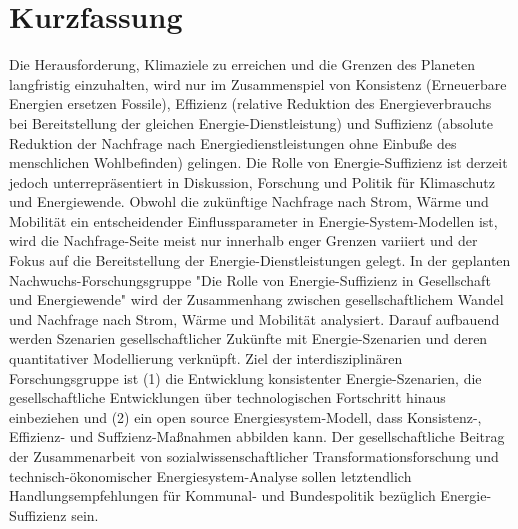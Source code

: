 \section*{Kurzfassung}
Die Herausforderung, Klimaziele zu erreichen und die Grenzen des Planeten langfristig einzuhalten, wird nur im Zusammenspiel von Konsistenz (Erneuerbare Energien ersetzen Fossile), Effizienz (relative Reduktion des Energieverbrauchs bei Bereitstellung der gleichen Energie-Dienstleistung) und Suffizienz (absolute Reduktion der Nachfrage nach Energiedienstleistungen ohne Einbuße des menschlichen Wohlbefinden) gelingen. Die Rolle von Energie-Suffizienz ist derzeit jedoch unterrepräsentiert in Diskussion, Forschung und Politik für Klimaschutz und Energiewende. Obwohl die zukünftige Nachfrage nach Strom, Wärme und Mobilität ein entscheidender Einflussparameter in Energie-System-Modellen ist, wird die Nachfrage-Seite meist nur innerhalb enger Grenzen variiert und der Fokus auf die Bereitstellung der Energie-Dienstleistungen gelegt.
In der geplanten Nachwuchs-Forschungsgruppe "Die Rolle von Energie-Suffizienz in Gesellschaft und Energiewende" wird der Zusammenhang zwischen gesellschaftlichem Wandel und Nachfrage nach Strom, Wärme und Mobilität analysiert. Darauf aufbauend werden Szenarien gesellschaftlicher Zukünfte mit Energie-Szenarien und deren quantitativer Modellierung verknüpft. Ziel der interdisziplinären Forschungsgruppe ist (1) die Entwicklung konsistenter Energie-Szenarien, die gesellschaftliche Entwicklungen über technologischen Fortschritt hinaus einbeziehen und (2) ein open source Energiesystem-Modell, dass Konsistenz-, Effizienz- und Suffzienz-Maßnahmen abbilden kann. Der gesellschaftliche Beitrag der Zusammenarbeit von sozialwissenschaftlicher Transformationsforschung und technisch-ökonomischer Energiesystem-Analyse sollen letztendlich Handlungsempfehlungen für Kommunal- und Bundespolitik bezüglich Energie-Suffizienz sein.


